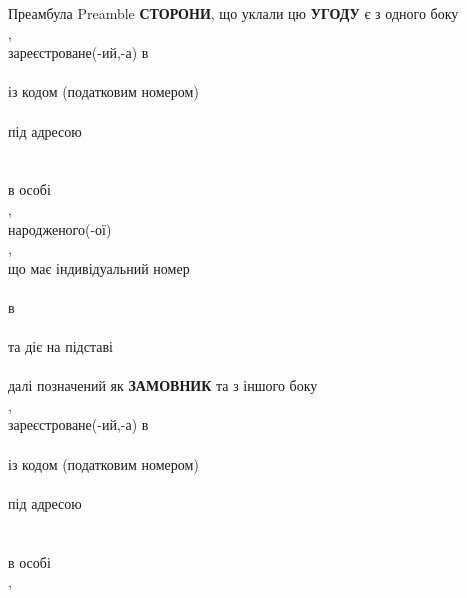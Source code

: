 \begin{Form}
    \begin{paracol}{3}
      \clause %
        {Преамбула} %
        {Preamble} %
        {}
        { \textbf{СТОРОНИ}, що уклали цю \textbf{УГОДУ} є з одного боку \\
          ,\\
          зареєстроване(-ий,-а) в\\
          \\
          із кодом (податковим номером)\\
          \\
          під адресою\\
          \\
          \\
          в особі\\
          ,\\
          народженого(-ої)\\
          ,\\
          що має індивідуальний номер\\
          \\
          в \\
          \\
          та діє на підставі\\
          \\
          далі позначений як \textbf{ЗАМОВНИК} та з іншого боку\\
          ,\\
          зареєстроване(-ий,-а) в\\
          \\
          із кодом (податковим номером)\\
          \\
          під адресою\\
          \\
          \\
          в особі\\
          ,\\
}
\end{paracol}
\end{Form}
